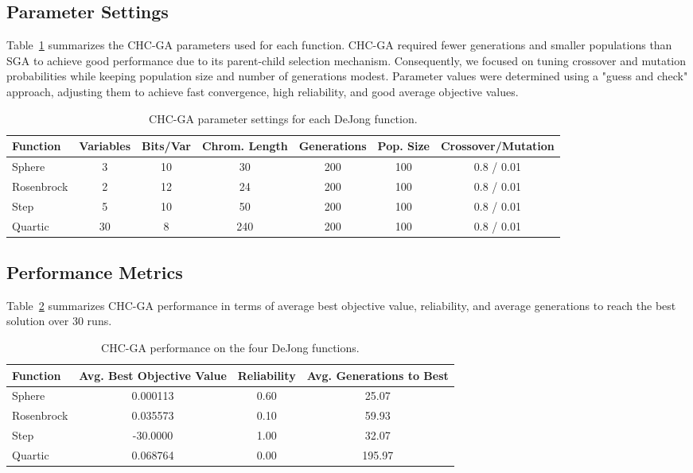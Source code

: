 \documentclass[11pt]{article}
\begin{document}
\newpage
\subsection{Parameter Settings}
Table~\ref{tab:chc-params} summarizes the CHC-GA parameters used for each function. CHC-GA required fewer generations and smaller populations than SGA to achieve good performance due to its parent-child selection mechanism. Consequently, we focused on tuning crossover and mutation probabilities while keeping population size and number of generations modest. Parameter values were determined using a "guess and check" approach, adjusting them to achieve fast convergence, high reliability, and good average objective values.

\begin{table}[H]
\centering
\caption{CHC-GA parameter settings for each DeJong function.}
\label{tab:chc-params}
\begin{tabular}{lcccccc}
\toprule
Function & Variables & Bits/Var & Chrom. Length & Generations & Pop. Size & Crossover/Mutation \\
\midrule
Sphere      & 3  & 10 & 30  & 200 & 100 & 0.8 / 0.01 \\
Rosenbrock  & 2  & 12 & 24  & 200 & 100 & 0.8 / 0.01 \\
Step        & 5  & 10 & 50  & 200 & 100 & 0.8 / 0.01 \\
Quartic     & 30 & 8  & 240 & 200 & 100 & 0.8 / 0.01 \\
\bottomrule
\end{tabular}
\end{table}

\subsection{Performance Metrics}
Table~\ref{tab:chc-performance} summarizes CHC-GA performance in terms of average best objective value, reliability, and average generations to reach the best solution over 30 runs.

\begin{table}[H]
\centering
\caption{CHC-GA performance on the four DeJong functions.}
\label{tab:chc-performance}
\begin{tabular}{lccc}
\toprule
Function   & Avg. Best Objective Value & Reliability & Avg. Generations to Best \\
\midrule
Sphere      & 0.000113  & 0.60 & 25.07 \\
Rosenbrock  & 0.035573  & 0.10 & 59.93 \\
Step        & -30.0000 & 1.00 & 32.07 \\
Quartic     & 0.068764 & 0.00 & 195.97 \\
\bottomrule
\end{tabular}
\end{table}
\end{document}
